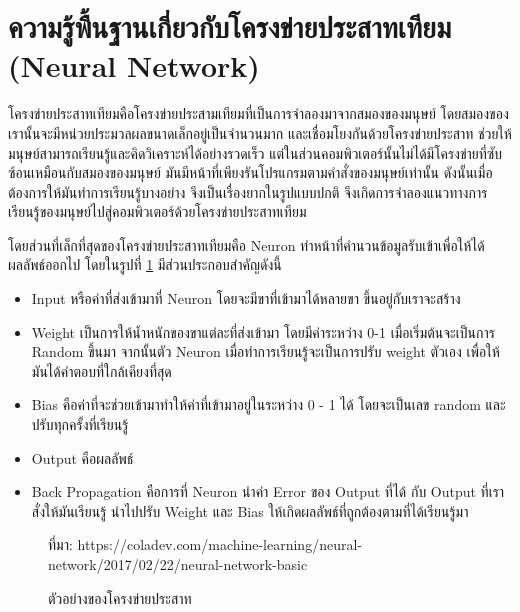 \section{ความรู้พื้นฐานเกี่ยวกับโครงข่ายประสาทเทียม (Neural Network)}
โครงข่ายประสาทเทียมคือโครงข่ายประสามเทียมที่เป็นการจำลองมาจากสมองของมนุษย์ โดยสมองของเรานั้นจะมีหน่วยประมวลผลขนาดเล็กอยู่เป็นจำนวนมาก และเชื่อมโยงกันด้วยโครงข่ายประสาท ช่วยให้มนุษย์สามารถเรียนรู้และคิดวิเคราะห์ได้อย่างรวดเร็ว แต่ในส่วนคอมพิวเตอร์นั้นไม่ได้มีโครงข่ายที่ซับซ้อนเหมือนกับสมองของมนุษย์ มันมีหน้าที่เพียงรันโปรแกรมตามคำสั่งของมนุษย์เท่านั้น ดังนั้นเมื่อต้องการให้มันทำการเรียนรู้บางอย่าง จึงเป็นเรื่องยากในรูปแบบปกติ จึงเกิดการจำลองแนวทางการเรียนรู้ของมนุษย์ไปสู่คอมพิวเตอร์ด้วยโครงข่ายประสาทเทียม \cite{neural}

โดยส่วนที่เล็กที่สุดของโครงข่ายประสาทเทียมคือ Neuron ทำหน้าที่คำนวนข้อมูลรับเข้าเพื่อให้ได้ผลลัพธ์ออกไป โดยในรูปที่ \ref{Fig:neural} มีส่วนประกอบสำคัญดังนี้
\begin{itemize}[label={--}]
	\item Input หรือค่าที่ส่งเข้ามาที่ Neuron โดยจะมีขาที่เข้ามาได้หลายขา ขึ้นอยู่กับเราจะสร้าง
	\item Weight เป็นการให้น้ำหนักของขาแต่ละที่ส่งเข้ามา โดยมีค่าระหว่าง 0-1 เมื่อเริ่มต้นจะเป็นการ Random ขึ้นมา จากนั้นตัว Neuron เมื่อทำการเรียนรู้จะเป็นการปรับ weight ตัวเอง เพื่อให้มันได้คำตอบที่ใกล้เคียงที่สุด
	\item Bias คือค่าที่จะช่วยเข้ามาทำให้ค่าที่เข้ามาอยู่ในระหว่าง 0 - 1 ได้ โดยจะเป็นเลข random และปรับทุกครั้งที่เรียนรู้
	\item Output คือผลลัพธ์
	\item Back Propagation คือการที่ Neuron นำค่า Error ของ Output ที่ได้ กับ Output ที่เราสั่งให้มันเรียนรู้ นำไปปรับ Weight และ Bias ให้เกิดผลลัพธ์ที่ถูกต้องตามที่ได้เรียนรู้มา
\end{itemize}
\begin{figure}[H]
	\caption{ตัวอย่างของโครงข่ายประสาท}{ที่มา: https://coladev.com/machine-learning/neural-network/2017/02/22/neural-network-basic}
	\label{Fig:neural}
\end{figure}




